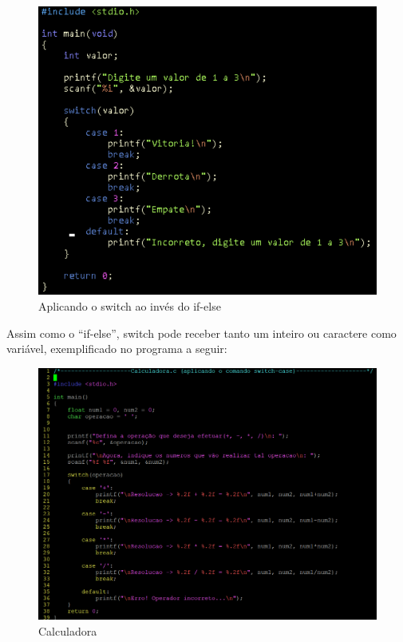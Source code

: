 \documentclass[a4paper,12pt]{article}  %
\begin{document}
\begin{figure}[H]
 \centering
 \includegraphics[width=.80\linewidth]{imagens/ex3.png}
 \caption{Aplicando o switch ao invés do if-else}
\end{figure}



   Assim como o “if-else”, switch pode receber tanto um inteiro ou caractere como variável, exemplificado no programa a seguir:

\begin{figure}[H]
 \centering
 \includegraphics[width=.80\linewidth]{imagens/ex4.png}
 \caption{Calculadora} %
 \label{fig:xsort}
\end{figure}
\end{document}

